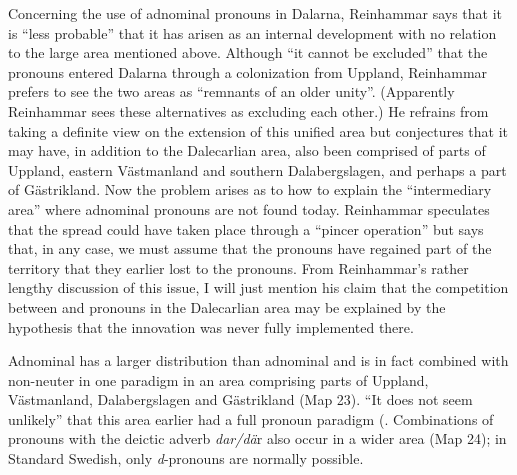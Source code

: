 
Concerning the use of adnominal pronouns in Dalarna, Reinhammar says that it is “less probable” that it has arisen as an internal development with no relation to the large area mentioned above. Although “it cannot be excluded” that the pronouns entered Dalarna through a colonization from Uppland, Reinhammar prefers to see the two areas as “remnants of an older unity”. (Apparently Reinhammar sees these alternatives as excluding each other.) He refrains from taking a definite view on the extension of this unified area but conjectures that it may have, in addition to the Dalecarlian area, also been comprised of parts of Uppland, eastern Västmanland and southern Dalabergslagen, and perhaps a part of Gästrikland. Now the problem arises as to how to explain the “intermediary area” where adnominal pronouns are not found today. Reinhammar speculates that the spread could have taken place through a “pincer operation” but says that, in any case, we must assume that the pronouns have regained part of the territory that they earlier lost to the pronouns. From Reinhammar’s rather lengthy discussion of this issue, I will just mention his claim that the competition between  and pronouns in the Dalecarlian area may be explained by the hypothesis that the innovation was never fully implemented there. 


Adnominal has a larger distribution than adnominal and is in fact combined with non-neuter  in one paradigm in an area comprising parts of Uppland, Västmanland, Dalabergslagen and Gästrikland (Map 23). “It does not seem unlikely” that this area earlier had a full pronoun paradigm (\citet[43]{Reinhammar1975}. Combinations of pronouns with the deictic adverb \textit{dar/dä}r also occur in a wider area (Map 24); in Standard Swedish, only \textit{d}{}-pronouns are normally possible.   


